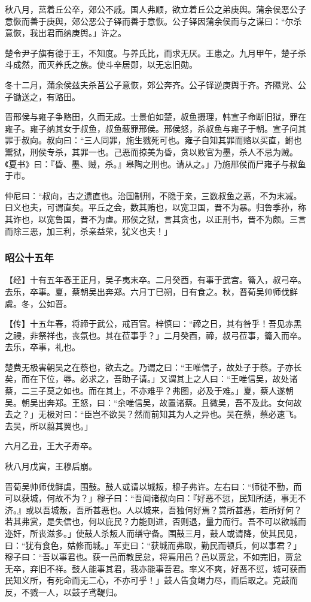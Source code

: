 \documentclass[]{article}
\begin{document}
秋八月，莒着丘公卒，郊公不戚。国人弗顺，欲立着丘公之弟庚舆。蒲余侯恶公子意恢而善于庚舆，郊公恶公子铎而善于意恢。公子铎因蒲余侯而与之谋曰：``尔杀意恢，我出君而纳庚舆。」许之。

楚令尹子旗有德于王，不知度。与养氏比，而求无厌。王患之。九月甲午，楚子杀斗成然，而灭养氏之族。使斗辛居郧，以无忘旧勋。

冬十二月，蒲余侯兹夫杀莒公子意恢，郊公奔齐。公子铎逆庚舆于齐。齐隰党、公子锄送之，有赂田。

晋邢侯与雍子争赂田，久而无成。士景伯如楚，叔鱼摄理，韩宣子命断旧狱，罪在雍子。雍子纳其女于叔鱼，叔鱼蔽罪邢侯。邢侯怒，杀叔鱼与雍子于朝。宣子问其罪于叔向。叔向曰：``三人同罪，施生戮死可也。雍子自知其罪而赂以买直，鲋也鬻狱，刑侯专杀，其罪一也。己恶而掠美为昏，贪以败官为墨，杀人不忌为贼。《夏书》曰：『昏、墨、贼，杀。』皋陶之刑也。请从之。」乃施邢侯而尸雍子与叔鱼于市。

仲尼曰：``叔向，古之遗直也。治国制刑，不隐于亲，三数叔鱼之恶，不为末减。曰义也夫，可谓直矣。平丘之会，数其贿也，以宽卫国，晋不为暴。归鲁季孙，称其诈也，以宽鲁国，晋不为虐。邢侯之狱，言其贪也，以正刑书，晋不为颇。三言而除三恶，加三利，杀亲益荣，犹义也夫！」

\hypertarget{header-n2620}{%
\subsubsection{昭公十五年}\label{header-n2620}}

【经】十有五年春王正月，吴子夷末卒。二月癸酉，有事于武宫。籥入，叔弓卒。去乐，卒事。夏，蔡朝吴出奔郑。六月丁巳朔，日有食之。秋，晋荀吴帅师伐鲜虞。冬，公如晋。

【传】十五年春，将禘于武公，戒百官。梓慎曰：``禘之日，其有咎乎！吾见赤黑之祲，非祭祥也，丧氛也。其在莅事乎？」二月癸酉，禘，叔弓莅事，籥入而卒。去乐，卒事，礼也。

楚费无极害朝吴之在蔡也，欲去之。乃谓之曰：``王唯信子，故处子于蔡。子亦长矣，而在下位，辱。必求之，吾助子请。」又谓其上之人曰：``王唯信吴，故处诸蔡，二三子莫之如也。而在其上，不亦难乎？弗图，必及于难。」夏，蔡人遂朝吴。朝吴出奔郑。王怒，曰：``余唯信吴，故置诸蔡。且微吴，吾不及此。女何故去之？」无极对曰：``臣岂不欲吴？然而前知其为人之异也。吴在蔡，蔡必速飞。去吴，所以翦其翼也。」

六月乙丑，王大子寿卒。

秋八月戊寅，王穆后崩。

晋荀吴帅师伐鲜虞，围鼓。鼓人或请以城叛，穆子弗许。左右曰：``师徒不勤，而可以获城，何故不为？」穆子曰：``吾闻诸叔向曰：『好恶不愆，民知所适，事无不济。』或以吾城叛，吾所甚恶也。人以城来，吾独何好焉？赏所甚恶，若所好何？若其弗赏，是失信也，何以庇民？力能则进，否则退，量力而行。吾不可以欲城而迩奸，所丧滋多。」使鼓人杀叛人而缮守备。围鼓三月，鼓人或请降，使其民见，曰：``犹有食色，姑修而城。」军吏曰：``获城而弗取，勤民而顿兵，何以事君？」穆子曰：``吾以事君也。获一邑而教民怠，将焉用邑？邑以贾怠，不如完旧，贾怠无卒，弃旧不祥。鼓人能事其君，我亦能事吾君。率义不爽，好恶不愆，城可获而民知义所，有死命而无二心，不亦可乎！」鼓人告食竭力尽，而后取之。克鼓而反，不戮一人，以鼓子鸢鞮归。
\end{document}
